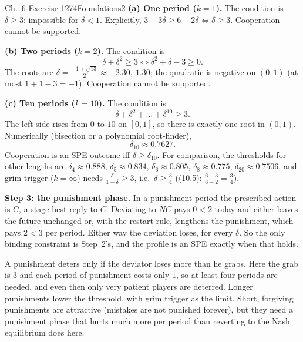 \begin{exsol}{\MG{} Ch.~6 Exercise 1}{274}{Foundations}{2}
\textbf{(a) One period ($k=1$).} The condition is $\delta \ge 3$: impossible for $\delta < 1$.
Explicitly, $3 + 3\delta \ge 6 + 2\delta \iff \delta \ge 3$. Cooperation cannot be supported.

\textbf{(b) Two periods ($k=2$).} The condition is
\[
  \delta + \delta^2 \ge 3 \iff \delta^2 + \delta - 3 \ge 0 .
\]
The roots are $\delta = \frac{-1\pm\sqrt{13}}{2} \approx -2.30,\ 1.30$; the quadratic is negative on
$(0,1)$ (at most $1 + 1 - 3 = -1$). Cooperation cannot be supported.

\textbf{(c) Ten periods ($k=10$).} The condition is
\[
  \delta + \delta^2 + \dots + \delta^{10} \ge 3 .
\]
The left side rises from $0$ to $10$ on $[0,1]$, so there is exactly one root in $(0,1)$. Numerically
(bisection or a polynomial root-finder),
\[
  \delta_{10} \approx 0.7627 .
\]
Cooperation is an SPE outcome iff $\delta \ge \delta_{10}$. For comparison, the thresholds for other
lengths are $\delta_4 \approx 0.888$, $\delta_5 \approx 0.834$, $\delta_6 \approx 0.805$, $\delta_8 \approx
0.775$, $\delta_{20} \approx 0.7506$, and grim trigger ($k = \infty$) needs $\frac{\delta}{1-\delta} \ge 3$,
i.e.\ $\delta \ge \frac34$ ((10.5): $\frac{6-3}{6-2} = \frac34$).

\textbf{Step 3: the punishment phase.} In a punishment period the prescribed action is $C$, a stage
best reply to $C$. Deviating to $NC$ pays $0 < 2$ today and either leaves the future unchanged or,
with the restart rule, lengthens the punishment, which pays $2 < 3$ per period. Either way the
deviation loses, for every $\delta$. So the only binding constraint is Step~2's, and the profile is an
SPE exactly when that holds.

\interp A punishment deters only if the deviator loses more than he grabs. Here the grab is $3$
and each period of punishment costs only $1$, so at least four periods are needed, and even then only
very patient players are deterred. Longer punishments lower the threshold, with grim trigger as the
limit. Short, forgiving punishments are attractive (mistakes are not punished forever), but they
need a punishment phase that hurts much more per period than reverting to the Nash equilibrium does
here.


\end{exsol}
